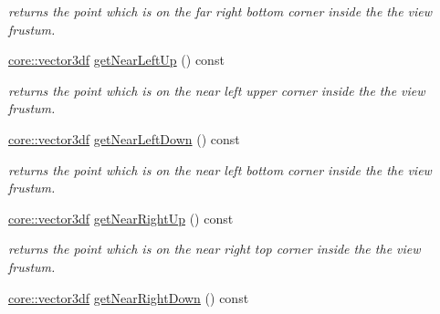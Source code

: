\begin{DoxyCompactItemize}
\begin{DoxyCompactList}\small\item\em returns the point which is on the far right bottom corner inside the the view frustum. \end{DoxyCompactList}\item 
\mbox{\label{structirr_1_1scene_1_1SViewFrustum_ae2fae0821834125e0d34bb2fab27c643}} 
\hyperlink{namespaceirr_1_1core_a06f169d08b5c429f5575acb7edbad811}{core\+::vector3df} \hyperlink{structirr_1_1scene_1_1SViewFrustum_ae2fae0821834125e0d34bb2fab27c643}{get\+Near\+Left\+Up} () const
\begin{DoxyCompactList}\small\item\em returns the point which is on the near left upper corner inside the the view frustum. \end{DoxyCompactList}\item 
\mbox{\label{structirr_1_1scene_1_1SViewFrustum_ae73eb80d9fe631b8795bb9f9afdf5eff}} 
\hyperlink{namespaceirr_1_1core_a06f169d08b5c429f5575acb7edbad811}{core\+::vector3df} \hyperlink{structirr_1_1scene_1_1SViewFrustum_ae73eb80d9fe631b8795bb9f9afdf5eff}{get\+Near\+Left\+Down} () const
\begin{DoxyCompactList}\small\item\em returns the point which is on the near left bottom corner inside the the view frustum. \end{DoxyCompactList}\item 
\mbox{\label{structirr_1_1scene_1_1SViewFrustum_a498ea58e0ce6c52e655aa9d7fe387b84}} 
\hyperlink{namespaceirr_1_1core_a06f169d08b5c429f5575acb7edbad811}{core\+::vector3df} \hyperlink{structirr_1_1scene_1_1SViewFrustum_a498ea58e0ce6c52e655aa9d7fe387b84}{get\+Near\+Right\+Up} () const
\begin{DoxyCompactList}\small\item\em returns the point which is on the near right top corner inside the the view frustum. \end{DoxyCompactList}\item 
\mbox{\label{structirr_1_1scene_1_1SViewFrustum_a6143916b2000537b33834cfb9aa898fa}} 
\hyperlink{namespaceirr_1_1core_a06f169d08b5c429f5575acb7edbad811}{core\+::vector3df} \hyperlink{structirr_1_1scene_1_1SViewFrustum_a6143916b2000537b33834cfb9aa898fa}{get\+Near\+Right\+Down} () const

\end{DoxyCompactItemize}
